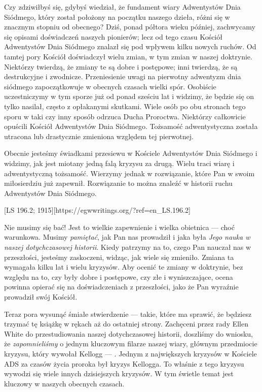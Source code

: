 Czy zdziwiłbyś się, gdybyś wiedział, że fundament wiary Adwentystów Dnia Siódmego, który został położony na początku naszego dzieła, różni się w znacznym stopniu od obecnego? Dziś, ponad półtora wieku później, zachwycamy się opisami doświadczeń naszych pionierów; lecz od tego czasu Kościół Adwentystów Dnia Siódmego znalazł się pod wpływem kilku nowych ruchów. Od tamtej pory Kościół doświadczył wielu zmian, w tym zmian w naszej doktrynie. Niektórzy twierdzą, że zmiany te są dobre i postępowe; inni twierdzą, że są destrukcyjne i zwodnicze. Przeniesienie uwagi na pierwotny adwentyzm dnia siódmego zapoczątkowuje w obecnych czasach wielki spór. Osobiście uczestniczymy w tym sporze już od ponad sześciu lat i widzimy, że będzie się on tylko nasilał, często z opłakanymi skutkami. Wiele osób po obu stronach tego sporu w taki czy inny sposób odrzuca Ducha Proroctwa. Niektórzy całkowicie opuścili Kościół Adwentystów Dnia Siódmego. Tożsamość adwentystyczna została utracona lub drastycznie zmieniona względem tej pierwotnej.

Obecnie jesteśmy świadkami przesiewu w Kościele Adwentystów Dnia Siódmego i widzimy, jak jest miotany jedną falą kryzysu za drugą. Wielu traci wiarę i adwentystyczną tożsamość. Wierzymy jednak w rozwiązanie, które Pan w swoim miłosierdziu już zapewnił. Rozwiązanie to można znaleźć w historii ruchu Adwentystów Dnia Siódmego.

[LS 196.2; 1915][https://egwwritings.org/?ref=en\_LS.196.2]

Nie musimy się bać! Jest to wielkie zapewnienie i wielka obietnica — choć warunkowa. Musimy \textit{pamiętać}, jak Pan nas prowadził i jaka była \textit{Jego nauka w naszej dotychczasowej historii}. Kiedy patrzymy na to, czego Pan nauczał nas w przeszłości, jesteśmy zaskoczeni, widząc, jak wiele się zmieniło. Zmiana ta wymagała kilku lat i wielu kryzysów. Aby ocenić te zmiany w doktrynie, bez względu na to, czy były dobre i postępowe, czy złe i wyniszczające, ocena powinna opierać się na doświadczeniach z przeszłości, jako że Pan wyraźnie prowadził swój Kościół.

Teraz pora wysunąć śmiałe stwierdzenie — takie, które ma sprawić, że będziesz trzymać tę książkę w rękach aż do ostatniej strony. Zachęceni przez rady Ellen White do przestudiowania naszej dotychczasowej historii, doszliśmy do wniosku, że \textit{zapomnieliśmy} o jednym kluczowym filarze naszej wiary, głównym przedmiocie kryzysu, który wywołał Kellogg — . Jednym z największych kryzysów w Kościele ADS za czasów życia proroka był kryzys Kellogga. To właśnie z tego kryzysu wywodzi się wiele innych dzisiejszych kryzysów. W tym świetle temat  jest kluczowy w naszych obecnych czasach.

